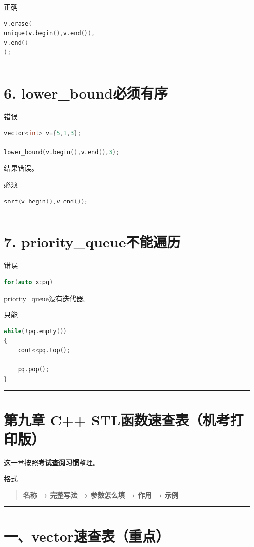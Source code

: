 \documentclass[10pt,twocolumn]{extarticle}
\begin{document}
正确：
\begin{lstlisting}[language=C++]
v.erase(
unique(v.begin(),v.end()),
v.end()
);
\end{lstlisting}

\noindent\rule{\linewidth}{0.4pt}

\section{6. lower\_bound必须有序}
错误：
\begin{lstlisting}[language=C++]
vector<int> v={5,1,3};

lower_bound(v.begin(),v.end(),3);
\end{lstlisting}
结果错误。

必须：
\begin{lstlisting}[language=C++]
sort(v.begin(),v.end());
\end{lstlisting}

\noindent\rule{\linewidth}{0.4pt}

\section{7. priority\_queue不能遍历}
错误：
\begin{lstlisting}[language=C++]
for(auto x:pq)
\end{lstlisting}
priority\_queue没有迭代器。

只能：
\begin{lstlisting}[language=C++]
while(!pq.empty())
{
    cout<<pq.top();

    pq.pop();
}
\end{lstlisting}

\noindent\rule{\linewidth}{0.4pt}

\section{第九章 C++ STL函数速查表（机考打印版）}

这一章按照\textbf{考试查阅习惯}整理。

格式：
\begin{quote}
\textbf{名称 → 完整写法 → 参数怎么填 → 作用 → 示例}
\end{quote}

\noindent\rule{\linewidth}{0.4pt}

\section{一、vector速查表（重点）}
\end{document}
